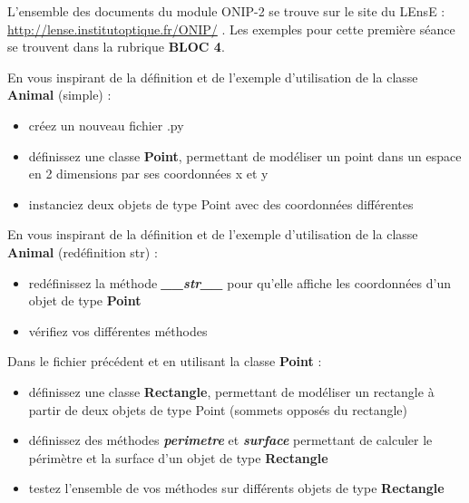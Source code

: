 \documentclass[10pt]{article} %
\begin{document}
\begin{minipage}[t]{.66\linewidth}
\begin{mdframed}[style=aavbox,frametitle={Acquis d'Apprentissage Visés}]
\end{mdframed}
\medskip

\hypertarget{stepbystep}{} %

L'ensemble des documents du module ONIP-2 se trouve sur le site du LEnsE : \hyperlink{http://lense.institutoptique.fr/ONIP/}{http://lense.institutoptique.fr/ONIP/} . Les exemples pour cette première séance se trouvent dans la rubrique \textbf{BLOC 4}.

\medskip


\begin{mdframed}[style=intextbox,frametitle={Exercice 1 - Classe Point}] %

En vous inspirant de la définition et de l'exemple d'utilisation de la classe \textbf{Animal} (simple) :

\begin{itemize}
	\item créez un nouveau fichier .py
	\item définissez une classe \textbf{Point}, permettant de modéliser un point dans un espace en 2 dimensions par ses coordonnées x et y
	\item instanciez deux objets de type Point avec des coordonnées différentes
\end{itemize}


En vous inspirant de la définition et de l'exemple d'utilisation de la classe \textbf{Animal} (redéfinition str) :

\begin{itemize}
	\item redéfinissez la méthode \textbf{\textit{\_\_str\_\_}} pour qu'elle affiche les coordonnées d'un objet de type \textbf{Point}
	\item vérifiez vos différentes méthodes
\end{itemize}

\end{mdframed}

\medskip

\begin{mdframed}[style=intextbox,frametitle={Exercice 2 - Classe Rectangle}] %

Dans le fichier précédent et en utilisant la classe \textbf{Point} :

\begin{itemize}
	\item définissez une classe \textbf{Rectangle}, permettant de modéliser un rectangle à partir de deux objets de type Point (sommets opposés du rectangle)
	\item définissez des méthodes \textit{\textbf{perimetre}} et \textit{\textbf{surface}} permettant de calculer le périmètre et la surface d'un objet de type \textbf{Rectangle}
	\item testez l'ensemble de vos méthodes sur différents objets de type \textbf{Rectangle}
\end{itemize}


\end{mdframed}
\end{minipage}
\end{document}
